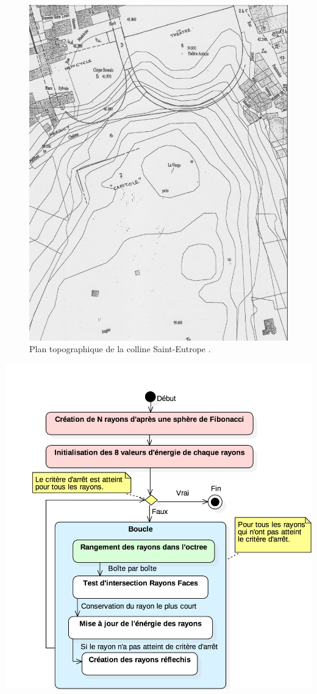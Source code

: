 \begin{figure}[!h]
	\includegraphics[width=\linewidth]{images/colline}
	\caption[Plan topographique de la colline Saint-Eutrope.]{Plan topographique de la colline Saint-Eutrope \cite[p.11]{orangeTxt}.}
	\label{colline} 
\end{figure} 	

\begin{figureth}
	\includegraphics[width=0.7\linewidth]{images/DiagRay2}
	\caption{Diagramme d'activité résumant le processus de création des rayons avec \gls{octree}.}
	\label{DiagRay2}
\end{figureth}	

